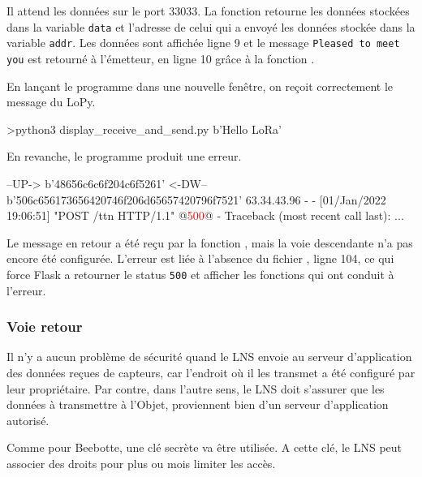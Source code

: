 Il attend les données sur le port 33033. La fonction  retourne les données stockées dans la variable \texttt{data} et l'adresse de celui qui a envoyé les données stockée dans la variable \texttt{addr}. Les données sont affichée ligne 9 et le message \texttt{Pleased to meet you} est retourné à l'émetteur, en ligne 10 grâce à la fonction .

         \vspace{1em}

En lançant le programme dans une nouvelle fenêtre, on reçoit correctement le message du LoPy.

\begin{termc}[backgroundcolor=\color{palerod}, basicstyle=\ttfamily\small, escapechar=@]
>python3 display_receive_and_send.py
b'Hello LoRa'
\end{termc}

En revanche, le programme  produit une erreur.

\begin{termc}[backgroundcolor=\color{palerod}, basicstyle=\ttfamily\small, escapechar=@]
--UP-> b'48656c6c6f204c6f5261'
<-DW-- b'506c656173656420746f206d65657420796f7521'
63.34.43.96 - - [01/Jan/2022 19:06:51] "POST /ttn HTTP/1.1" @\textcolor{red}{500}@ -
Traceback (most recent call last):
...
\end{termc}

Le message en retour a été reçu par la fonction \texttt{}, mais la voie descendante n'a pas encore été configurée. L'erreur est liée à l'absence du fichier , ligne 104, ce qui force Flask a retourner le status \texttt{500} et afficher les fonctions qui ont conduit à l'erreur.

\subsubsection{Voie retour}

Il n'y a aucun problème de sécurité quand le LNS envoie au serveur d'application des données reçues de capteurs, car l'endroit où il les transmet a été configuré par leur propriétaire. Par contre, dans l'autre sens, le LNS doit s'assurer que les données à transmettre à l'Objet, proviennent bien d'un serveur d'application autorisé.

Comme pour Beebotte, une clé secrète va être utilisée. A cette clé, le LNS peut associer des droits pour plus ou mois limiter les accès.
